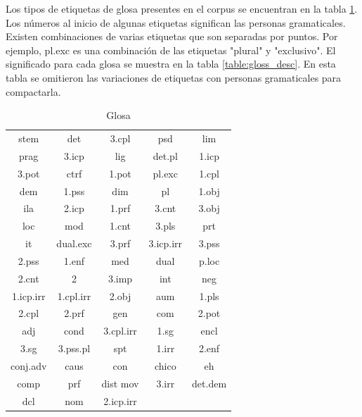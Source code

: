 \documentclass[letterpaper,12pt,oneside]{scrbook}
\theoremstyle{definition}
\begin{document}
	
	Los tipos de etiquetas de glosa presentes en el corpus se encuentran en la tabla \ref{table:gloss_types}. Los números al inicio de algunas etiquetas significan las personas gramaticales. Existen combinaciones de varias etiquetas que son separadas por puntos. Por ejemplo, \textsf{pl.exc} es una combinación de las etiquetas "plural" y "exclusivo". El significado para cada glosa se muestra en la tabla \ref{table:gloss_desc}. En esta tabla se omitieron las variaciones de etiquetas con personas gramaticales para compactarla.

	
	
	\begin{table}

		\centering

		\begin{tabular}{| c | c | c | c | c |}

			\hline

			stem & det & 3.cpl & psd & lim \\

			prag & 3.icp & lig & det.pl & 1.icp \\

			3.pot & ctrf & 1.pot & pl.exc & 1.cpl \\

			dem & 1.pss & dim & pl & 1.obj \\

			ila & 2.icp & 1.prf & 3.cnt & 3.obj \\

			loc & mod & 1.cnt & 3.pls & prt \\

			it & dual.exc & 3.prf & 3.icp.irr & 3.pss \\

			2.pss & 1.enf & med & dual & p.loc \\

			2.cnt & 2 & 3.imp & int & neg \\

			1.icp.irr & 1.cpl.irr & 2.obj & aum & 1.pls \\

			2.cpl & 2.prf & gen & com & 2.pot\\

			adj & cond  & 3.cpl.irr & 1.sg & encl \\

			3.sg & 3.pss.pl & spt & 1.irr & 2.enf \\

			conj.adv & caus & con & chico & eh \\

			comp & prf & dist mov & 3.irr & det.dem\\

			dcl & nom & 2.icp.irr & & \\

			\hline

		\end{tabular}

		\caption{Glosa}

		\label{table:gloss_types}

	\end{table}
\end{document}
